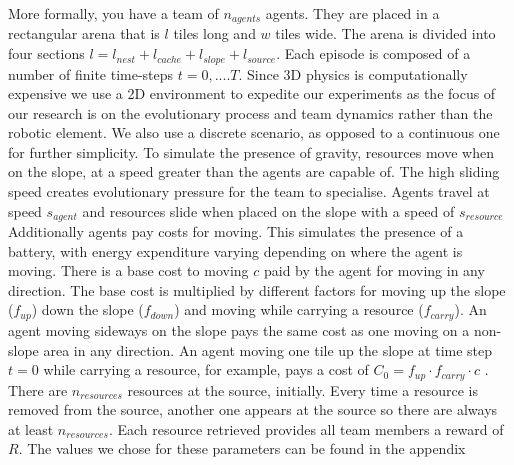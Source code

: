 \documentclass[12pt]{article}  %
\begin{document}
More formally, you have a team of $n_{agents}$ agents. 
They are placed in a rectangular arena that is $l$ tiles long and $w$ tiles wide. 
The arena is divided into four sections $l= l_{nest} + l_{cache} + l_{slope} + l_{source}$.
Each episode is composed of a number of finite time-steps $t=0, .... T$. 
Since 3D physics is computationally expensive we use a 2D environment to expedite our experiments as the focus of our research is on the evolutionary process and team dynamics rather than the robotic element.
We also use a discrete scenario, as opposed to a continuous one for further simplicity.
To simulate the presence of gravity, resources move when on the slope, at a speed greater than the agents are capable of.
The high sliding speed creates evolutionary pressure for the team to specialise.
Agents travel at speed $s_{agent}$ and resources slide when placed on the slope with a speed of $s_{resource}$ 
Additionally agents pay costs for moving.
This simulates the presence of a battery, with energy expenditure varying depending on where the agent is moving.
There is a base cost to moving $c$ paid by the agent for moving in any direction.
The base cost is multiplied by different factors for moving up the slope ($f_{up}$) down the slope ($f_{down}$) and moving while carrying a resource ($f_{carry}$). 
An agent moving sideways on the slope pays the same cost as one moving on a non-slope area in any direction.
An agent moving one tile up the slope at time step $t=0$ while carrying a resource, for example, pays a cost of $C_{0} = f_{up} \cdot f_{carry} \cdot c$ .
There are $n_{resources}$ resources at the source, initially.
Every time a resource is removed from the source, another one appears at the source so there are always at least $n_{resources}$.
Each resource retrieved provides all team members a reward of $R$.
The values we chose for these parameters can be found in the appendix\\
\end{document}
